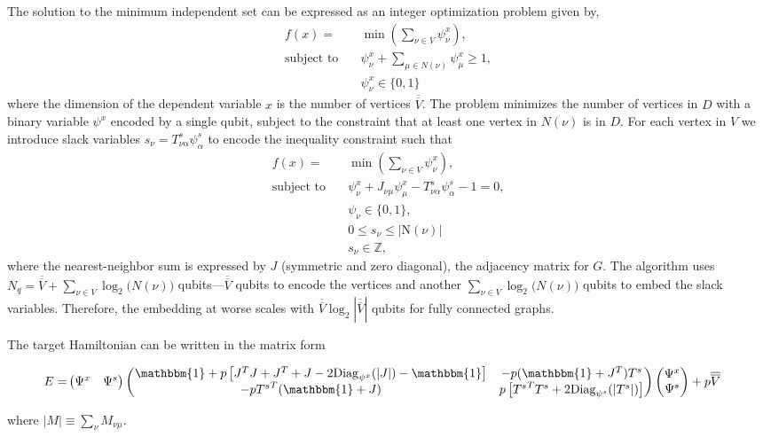 \documentclass[prd,twocolumn,tightenlines,preprintnumbers,showpacs,superscriptaddress,notitlepage,nofootinbib,eqsecnum,floatfix,longbibliography]{revtex4}
\begin{document}
The solution to the minimum independent set can be expressed as an integer optimization problem given by,
\begin{align}
    f(x) = &\min\left(\sum_{\nu \in V} \psi^x_{\nu}\right),\\
    \textrm{subject to} \quad & \psi^x_{\nu} + \sum_{\mu \in \mathit{N}(\nu)} \psi^x_{\mu} \geq 1,\\
    & \psi^x_{\nu} \in \{0, 1\}
\end{align}
where the dimension of the dependent variable $x$ is the number of vertices $\overline{\overline{V}}$.
The problem minimizes the number of vertices in $D$ with a binary variable $\psi^x$ encoded by a single qubit, subject to the constraint that at least one vertex in $\mathit{N}(\nu)$ is in $D$.
For each vertex in $V$ we introduce slack variables $s_{\nu} = T^s_{\nu \alpha} \psi^s_{\alpha}$ to encode the inequality constraint such that
\begin{align}
    f(x) = &\min(\sum_{\nu\in V} \psi^x_{\nu}),\\
    \textrm{subject to} \quad & \psi^x_{\nu} + J_{\nu \mu} \psi^x_{\mu}- T^s_{\nu \alpha} \psi^s_{\alpha}  - 1 = 0,\\
    & \psi_{\nu} \in \{0, 1\},\\
    & 0 \leq s_{\nu} \leq |\mathrm{N}(\nu)|\\
    & s_{\nu} \in \mathbb{Z},
\end{align}
where the nearest-neighbor sum is expressed by $J$ (symmetric and zero diagonal), the adjacency matrix for $G$.
The algorithm uses $N_q = \overline{\overline{V}} + \sum_{\nu \in V} \log_2 \mathit(N(\nu))$ qubits---$\overline{\overline{V}}$ qubits to encode the vertices and another $\sum_{\nu \in V} \log_2 \mathit(N(\nu))$ qubits to embed the slack variables.
Therefore, the embedding at worse scales with $\overline{\overline{V}} \log_2 |\overline{\overline{V}}|$ qubits for fully connected graphs.

The target Hamiltonian can be written in the matrix form
\begin{widetext}
\begin{align}
    E = &
    \begin{pmatrix}
    \Psi^x & \Psi^s
    \end{pmatrix}
    \begin{pmatrix}
    \mathbbm{1} + p\left[J^T J + J^T + J - 2 \mathrm{Diag}_{\psi^x}(|J|) - \mathbbm{1} \right] & - p(\mathbbm{1}+J^T)T^s\\
    - p{T^s}^T(\mathbbm{1}+J)& p\left[{T^s}^T T^s + 2\mathrm{Diag}_{\psi^s}(|T^s|)\right]
    \end{pmatrix}
    \begin{pmatrix}
    \Psi^x\\ \Psi^s
    \end{pmatrix} + p \overline{\overline{V}}
    \label{eq:matrix_form}
\end{align}
\end{widetext}
where $ |M| \equiv \sum_{\nu} M_{\nu \mu}$.
\end{document}
